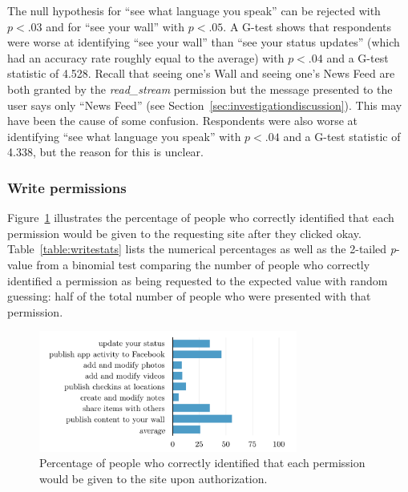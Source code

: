 \documentclass[10pt]{sig-alternate-10pt}
\begin{document}
The null hypothesis for ``see what language you speak'' can be rejected with $p < .03$ and for ``see your wall'' with $p < .05$. A G-test shows that respondents were worse at identifying ``see your wall'' than ``see your status updates'' (which had an accuracy rate roughly equal to the average) with $p < .04$ and a G-test statistic of 4.528. Recall that seeing one's Wall and seeing one's News Feed are both granted by the \emph{read\_stream} permission but the message presented to the user says only ``News Feed'' (see Section~\ref{sec:investigationdiscussion}). This may have been the cause of some confusion. Respondents were also worse at identifying ``see what language you speak'' with $p < .04$ and a G-test statistic of 4.338, but the reason for this is unclear.

\subsubsection{Write permissions}

Figure~\ref{figure:writepercents} illustrates the percentage of people who correctly identified that each permission would be given to the requesting site after they clicked okay. Table~\ref{table:writestats} lists the numerical percentages as well as the 2-tailed \emph{p}-value from a binomial test comparing the number of people who correctly identified a permission as being requested to the expected value with random guessing: half of the total number of people who were presented with that permission.

\begin{figure}[h!]
  \centering
  \includegraphics[width=8.5cm]{write_percents_cosn}
  \caption{Percentage of people who correctly identified that each permission would be given to the site upon authorization.}
  \label{figure:writepercents}
\end{figure}
\end{document}
